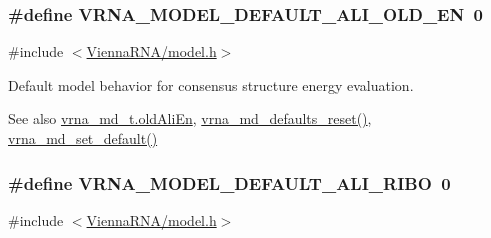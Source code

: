 \subsubsection[{\texorpdfstring{V\+R\+N\+A\+\_\+\+M\+O\+D\+E\+L\+\_\+\+D\+E\+F\+A\+U\+L\+T\+\_\+\+A\+L\+I\+\_\+\+O\+L\+D\+\_\+\+EN}{VRNA_MODEL_DEFAULT_ALI_OLD_EN}}]{\setlength{\rightskip}{0pt plus 5cm}\#define V\+R\+N\+A\+\_\+\+M\+O\+D\+E\+L\+\_\+\+D\+E\+F\+A\+U\+L\+T\+\_\+\+A\+L\+I\+\_\+\+O\+L\+D\+\_\+\+EN~0}\hypertarget{group__model__details_ga2a5bbfc1edf33077e39466d2d9807115}{}\label{group__model__details_ga2a5bbfc1edf33077e39466d2d9807115}


{\ttfamily \#include $<$\hyperlink{model_8h}{Vienna\+R\+N\+A/model.\+h}$>$}



Default model behavior for consensus structure energy evaluation. 

\begin{DoxySeeAlso}{See also}
\hyperlink{structvrna__md__s_ab53aec4503130877973c6111ae6f0f76}{vrna\+\_\+md\+\_\+t.\+old\+Ali\+En}, \hyperlink{group__model__details_ga70834424cf804d149937de89f80ceb45}{vrna\+\_\+md\+\_\+defaults\+\_\+reset()}, \hyperlink{group__model__details_ga8ac6ff84936282436f822644bf841f66}{vrna\+\_\+md\+\_\+set\+\_\+default()} 
\end{DoxySeeAlso}
\subsubsection[{\texorpdfstring{V\+R\+N\+A\+\_\+\+M\+O\+D\+E\+L\+\_\+\+D\+E\+F\+A\+U\+L\+T\+\_\+\+A\+L\+I\+\_\+\+R\+I\+BO}{VRNA_MODEL_DEFAULT_ALI_RIBO}}]{\setlength{\rightskip}{0pt plus 5cm}\#define V\+R\+N\+A\+\_\+\+M\+O\+D\+E\+L\+\_\+\+D\+E\+F\+A\+U\+L\+T\+\_\+\+A\+L\+I\+\_\+\+R\+I\+BO~0}\hypertarget{group__model__details_ga64b3ab65a9ca42d4ad1d05e193083147}{}\label{group__model__details_ga64b3ab65a9ca42d4ad1d05e193083147}


{\ttfamily \#include $<$\hyperlink{model_8h}{Vienna\+R\+N\+A/model.\+h}$>$}



